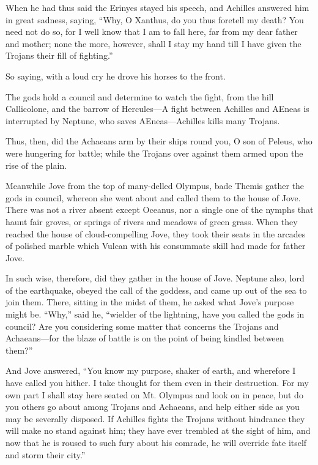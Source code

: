 When he had thus said the Erinyes stayed his speech, and Achilles answered
him in great sadness, saying, “Why, O Xanthus, do you thus foretell my
death? You need not do so, for I well know that I am to fall here, far
from my dear father and mother; none the more, however, shall I stay my
hand till I have given the Trojans their fill of fighting.”

So saying, with a loud cry he drove his horses to the front.


The gods hold a council and determine to watch the fight, from the hill
Callicolone, and the barrow of Hercules—A fight between Achilles and
AEneas is interrupted by Neptune, who saves AEneas—Achilles kills
many Trojans.

Thus, then, did the Achaeans arm by their ships round you, O son of
Peleus, who were hungering for battle; while the Trojans over against them
armed upon the rise of the plain.

Meanwhile Jove from the top of many-delled Olympus, bade Themis gather the
gods in council, whereon she went about and called them to the house of
Jove. There was not a river absent except Oceanus, nor a single one of the
nymphs that haunt fair groves, or springs of rivers and meadows of green
grass. When they reached the house of cloud-compelling Jove, they took
their seats in the arcades of polished marble which Vulcan with his
consummate skill had made for father Jove.

In such wise, therefore, did they gather in the house of Jove. Neptune
also, lord of the earthquake, obeyed the call of the goddess, and came up
out of the sea to join them. There, sitting in the midst of them, he asked
what Jove’s purpose might be. “Why,” said he, “wielder of the lightning,
have you called the gods in council? Are you considering some matter that
concerns the Trojans and Achaeans—for the blaze of battle is on the
point of being kindled between them?”

And Jove answered, “You know my purpose, shaker of earth, and wherefore I
have called you hither. I take thought for them even in their destruction.
For my own part I shall stay here seated on Mt. Olympus and look on in
peace, but do you others go about among Trojans and Achaeans, and help
either side as you may be severally disposed. If Achilles fights the
Trojans without hindrance they will make no stand against him; they have
ever trembled at the sight of him, and now that he is roused to such fury
about his comrade, he will override fate itself and storm their city.”

